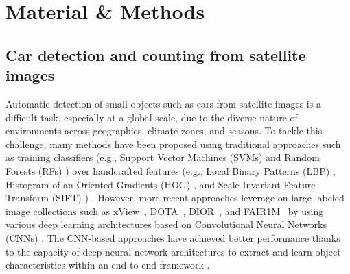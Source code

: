 \documentclass[sn-basic]{sn-jnl}%
\begin{document}



\section{Material \& Methods}\label{MM}


\subsection{Car detection and counting from satellite images} \label{MMS1}



Automatic detection of small objects such as cars from satellite images is a difficult task, especially at a global scale, due to the diverse nature of environments across geographies, climate zones, and seasons. To tackle this challenge, many methods have been proposed using traditional approaches such as training classifiers (e.g., Support Vector Machines (SVMs) \citep{cortes1995support} and Random Forests (RFs) \citep{breiman2001random}) over handcrafted features (e.g., Local Binary Patterns (LBP) \citep{ahonen2004face}, Histogram of an Oriented Gradients (HOG) \citep{dalal2005histograms}, and Scale-Invariant Feature Transform (SIFT) \citep{lowe1999object}) \citep{eikvil2009classification, leitloff2010vehicle, bar2013moving}. However, more recent approaches leverage on large labeled image collections such as xView~\citep{lam2018xview}, DOTA~\citep{xia2018dota}, DIOR~\citep{li2020object}, and FAIR1M~\citep{sun2022fair1m} by using various deep learning architectures based on Convolutional Neural Networks (CNNs) \citep{girshick2015fast, redmon2016you, Liu_et_al_2016, lin2017focal}. The CNN-based approaches have achieved better performance thanks to the capacity of deep neural network architectures to extract and learn object characteristics within an end-to-end framework \citep{long2017accurate, yang2019scrdet, li2020object, ding2021object, akyon2022slicing, chen2014vehicle, cao2016vehicle, cao2017weakly, froidevaux2020vehicle}.
\end{document}
